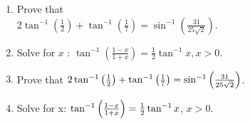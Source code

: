 \begin{enumerate}
\item Prove that \\
$2\tan^{-1}{(\frac{1}{2})} + \tan^{-1}{(\frac{1}{7})} = \sin^{-1}{(\frac{31}{25\sqrt{2}})}$.

\item Solve for $x$ : $\tan^{-1}{(\frac{1-x}{1+x})}= \frac{1}{2} \tan^{-1}{x} , x>0$.

\item Prove that $2\tan^{-1}\left(\frac{1}{2}\right)+\tan^{-1}\left(\frac{1}{7}\right) = \sin^{-1}\left(\frac{31}{25\sqrt{2}}\right)$. 

\item Solve for x: $\tan^{-1}\left(\frac{1-x}{1+x}\right) = \frac{1}{2}\tan^{-1}x$, $x>0$. 
\end{enumerate}
